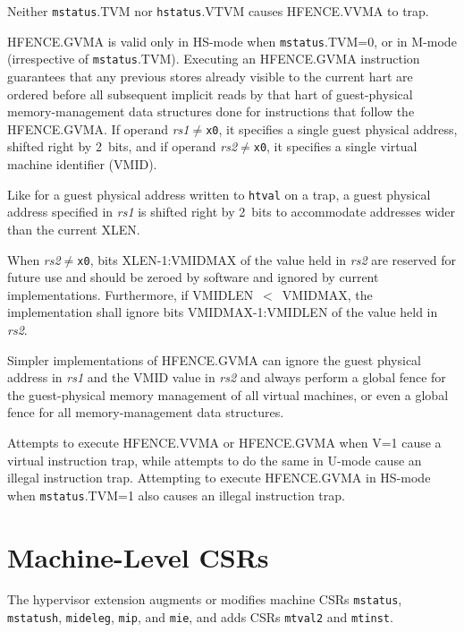 Neither {\tt mstatus}.TVM nor {\tt hstatus}.VTVM causes HFENCE.VVMA to
trap.

HFENCE.GVMA is valid only in HS-mode when {\tt mstatus}.TVM=0, or in
M-mode (irrespective of {\tt mstatus}.TVM).
Executing an HFENCE.GVMA instruction guarantees that any previous stores
already visible to the current hart are ordered before all subsequent implicit
reads by that hart of guest-physical memory-management data structures done for instructions
that follow the HFENCE.GVMA.
If operand {\em rs1}$\neq${\tt x0}, it specifies a single guest physical
address, shifted right by 2~bits, and if operand {\em rs2}$\neq${\tt x0}, it
specifies a single virtual machine identifier (VMID).

\begin{commentary}
Like for a guest physical address written to {\tt htval} on a
trap, a guest physical address specified in {\em rs1} is shifted
right by 2~bits to accommodate addresses wider than the current XLEN.
\end{commentary}

When {\em rs2}$\neq${\tt x0}, bits XLEN-1:VMIDMAX of the value held in {\em
rs2} are reserved for future use and should be zeroed by software and ignored
by current implementations.
Furthermore, if VMIDLEN~$<$~VMIDMAX, the implementation shall ignore bits
VMIDMAX-1:VMIDLEN of the value held in {\em rs2}.

\begin{commentary}
Simpler implementations of HFENCE.GVMA can ignore the guest physical address in
{\em rs1} and the VMID value in {\em rs2} and always perform a global fence for
the guest-physical memory management of all virtual machines, or even a global
fence for all memory-management data structures.
\end{commentary}

Attempts to execute HFENCE.VVMA or HFENCE.GVMA when V=1 cause a virtual
instruction trap, while attempts to do the same in U-mode
cause an illegal instruction trap.
Attempting to execute HFENCE.GVMA in HS-mode when {\tt mstatus}.TVM=1
also causes an illegal instruction trap.

\section{Machine-Level CSRs}

The hypervisor extension augments or modifies machine CSRs {\tt mstatus},
{\tt mstatush}, {\tt mideleg}, {\tt mip}, and {\tt mie}, and
adds CSRs {\tt mtval2} and {\tt mtinst}.

